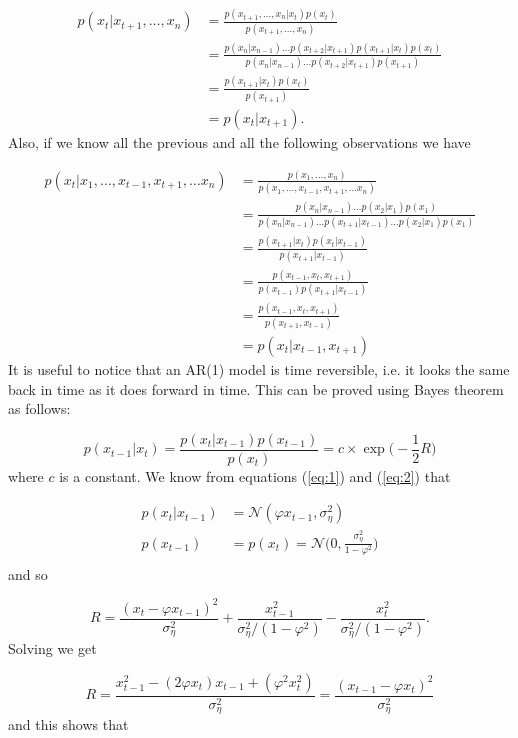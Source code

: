 \documentclass[11pt,a4paper]{article}
\begin{document}
{\begin{align*}
    p(x_t | x_{t+1}, \dots, x_n) &= \frac{p(x_{t+1},\dots, x_n | x_t) p(x_t)}{p(x_{t+1}, \dots, x_n)}\\
    &= \frac{p(x_n | x_{n-1})\dots p(x_{t+2} | x_{t+1}) p(x_{t+1} | x_t) p(x_t)}{p(x_n | x_{n-1})\dots p(x_{t+2} | x_{t+1}) p(x_{t+1})}\\
    &= \frac{p(x_{t+1} | x_t) p(x_t)}{p(x_{t+1})}\\
    &= p(x_t | x_{t+1}).
\end{align*}
Also, if we know all the previous and all the following observations we have

\begin{align*}
    p(x_t | x_1, \dots, x_{t-1}, x_{t+1}, \dots x_n) &= \frac{p(x_1,\dots, x_n)}{p(x_1, \dots, x_{t-1}, x_{t+1}, \dots x_n)}\\
    &= \frac{p(x_n | x_{n-1})\dots p(x_2 | x_1) p(x_1)}{p(x_n | x_{n-1})\dots p(x_{t+1} | x_{t-1}) \dots p(x_2 | x_1) p(x_1)}\\
    &= \frac{p(x_{t+1} | x_t) p(x_t | x_{t-1})}{p(x_{t+1} | x_{t-1})}\\
    &= \frac{p(x_{t-1}, x_t, x_{t+1})}{p(x_{t-1}) p(x_{t+1} | x_{t-1})}\\
    &= \frac{p(x_{t-1}, x_t, x_{t+1})}{p(x_{t+1}, x_{t-1})}\\
    &= p(x_t | x_{t-1}, x_{t+1})
\end{align*}
It is useful to notice that an AR(1) model is time reversible, i.e. it looks the same back in time as it does forward in time.
This can be proved using Bayes theorem as follows:

\[
    p(x_{t-1} | x_t) = \frac{p(x_t | x_{t-1}) p(x_{t-1})}{p(x_t)} = c\times \exp\Big(-\frac{1}{2} R\Big)
\]
where $c$ is a constant.
We know from equations (\ref{eq:1}) and (\ref{eq:2}) that 

\begin{align*}
    p(x_t | x_{t-1}) &= \mathcal{N}(\varphi x_{t-1}, \sigma^2_\eta)\\
    p(x_{t-1}) &= p(x_t) = \mathcal{N} \Bigg(0, \frac{\sigma^2_\eta}{1-\varphi^2} \Bigg)\\
\end{align*}
and so 

\[
    R = \frac{(x_t - \varphi x_{t-1})^2}{\sigma^2_\eta} + \frac{x_{t-1}^2}{\sigma^2_\eta / (1-\varphi^2)} - \frac{x_{t}^2}{\sigma^2_\eta / (1-\varphi^2)}.
\]
Solving we get

\[
    R = \frac{x_{t-1}^2 - (2\varphi x_t) x_{t-1}+ (\varphi^2 x_t^2)}{\sigma^2_\eta} = \frac{(x_{t-1} - \varphi x_t)^2}{\sigma^2_\eta}
\]
and this shows that

}
\end{document}
